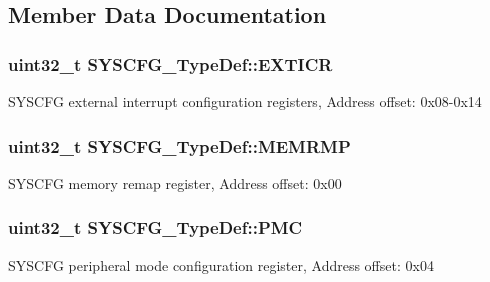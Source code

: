 \subsection{Member Data Documentation}
\hypertarget{struct_s_y_s_c_f_g___type_def_a348aafac7a09a6e93e73e5acbccc34d3}{
\subsubsection[{E\-X\-T\-I\-C\-R}]{ uint32\-\_\-t S\-Y\-S\-C\-F\-G\-\_\-\-Type\-Def\-::\-E\-X\-T\-I\-C\-R}}\label{struct_s_y_s_c_f_g___type_def_a348aafac7a09a6e93e73e5acbccc34d3}
S\-Y\-S\-C\-F\-G external interrupt configuration registers, Address offset\-: 0x08-\/0x14 \hypertarget{struct_s_y_s_c_f_g___type_def_a85b9d3df2274b730327b181c402a7bf5}{
\subsubsection[{M\-E\-M\-R\-M\-P}]{ uint32\-\_\-t S\-Y\-S\-C\-F\-G\-\_\-\-Type\-Def\-::\-M\-E\-M\-R\-M\-P}}\label{struct_s_y_s_c_f_g___type_def_a85b9d3df2274b730327b181c402a7bf5}
S\-Y\-S\-C\-F\-G memory remap register, Address offset\-: 0x00 \hypertarget{struct_s_y_s_c_f_g___type_def_ab5c47c570566cb8ff9d0436c17cc9241}{
\subsubsection[{P\-M\-C}]{ uint32\-\_\-t S\-Y\-S\-C\-F\-G\-\_\-\-Type\-Def\-::\-P\-M\-C}}\label{struct_s_y_s_c_f_g___type_def_ab5c47c570566cb8ff9d0436c17cc9241}
S\-Y\-S\-C\-F\-G peripheral mode configuration register, Address offset\-: 0x04 

